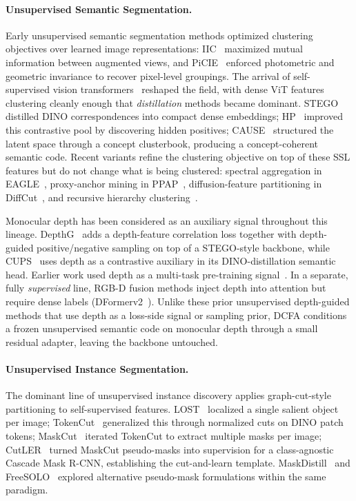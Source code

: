 \documentclass[10pt,twocolumn,letterpaper]{article}
\begin{document}
\paragraph{Unsupervised Semantic Segmentation.}
Early unsupervised semantic segmentation methods optimized clustering objectives over learned image representations: IIC~\cite{ji2019iic} maximized mutual information between augmented views, and PiCIE~\cite{cho2021picie} enforced photometric and geometric invariance to recover pixel-level groupings. The arrival of self-supervised vision transformers~\cite{caron2021dino,oquab2024dinov2} reshaped the field, with dense ViT features clustering cleanly enough that \emph{distillation} methods became dominant. STEGO~\cite{hamilton2022stego} distilled DINO correspondences into compact dense embeddings; HP~\cite{seong2023hp} improved this contrastive pool by discovering hidden positives; CAUSE~\cite{kim2024cause} structured the latent space through a concept clusterbook, producing a concept-coherent semantic code. Recent variants refine the clustering objective on top of these SSL features but do not change what is being clustered: spectral aggregation in EAGLE~\cite{kim2024eagle}, proxy-anchor mining in PPAP~\cite{seong2024ppap}, diffusion-feature partitioning in DiffCut~\cite{couairon2024diffcut}, and recursive hierarchy clustering~\cite{bonnet2024hierarchy}.

Monocular depth has been considered as an auxiliary signal throughout this lineage. DepthG~\cite{sick2024depthg} adds a depth-feature correlation loss together with depth-guided positive/negative sampling on top of a STEGO-style backbone, while CUPS~\cite{hahn2025cups} uses depth as a contrastive auxiliary in its DINO-distillation semantic head. Earlier work used depth as a multi-task pre-training signal~\cite{hoyer2021threeways}. In a separate, fully \emph{supervised} line, RGB-D fusion methods inject depth into attention but require dense labels (DFormerv2~\cite{yin2025dformerv2}). Unlike these prior unsupervised depth-guided methods that use depth as a loss-side signal or sampling prior, DCFA conditions a frozen unsupervised semantic code on monocular depth through a small residual adapter, leaving the backbone untouched.

\paragraph{Unsupervised Instance Segmentation.}
The dominant line of unsupervised instance discovery applies graph-cut-style partitioning to self-supervised features. LOST~\cite{simeoni2021lost} localized a single salient object per image; TokenCut~\cite{wang2023tokencut} generalized this through normalized cuts on DINO patch tokens; MaskCut~\cite{wang2023cutler} iterated TokenCut to extract multiple masks per image; CutLER~\cite{wang2023cutler} turned MaskCut pseudo-masks into supervision for a class-agnostic Cascade Mask R-CNN, establishing the cut-and-learn template. MaskDistill~\cite{vangansbeke2022maskdistill} and FreeSOLO~\cite{wang2022freesolo} explored alternative pseudo-mask formulations within the same paradigm.
\end{document}
